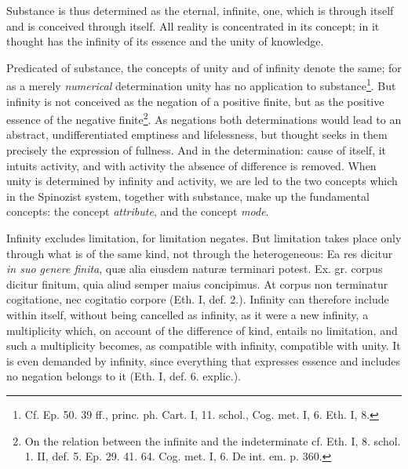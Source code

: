 \documentclass[12pt,a4paper,openany]{book}
\newcommand{\opage}[1]{\marginnote{\footnotesize\textit{[#1]}}}
\begin{document}
\opage{46}\setcounter{footnote}{0}Substance is thus determined as the eternal, infinite, one, which is through itself and is
conceived through itself. All reality is concentrated in
its concept; in it thought has the infinity of its essence and the unity
of knowledge.

Predicated of substance, the concepts of unity and of infinity denote the
same; for as a merely \emph{numerical} determination unity has no application
to substance\footnote{Cf. Ep. 50. 39 ff., princ. ph. Cart. I, 11.
schol., Cog. met. I, 6. Eth. I, 8.}. But infinity is not conceived
as the negation of a positive finite, but as the positive essence of the
negative finite\footnote{On the relation between the infinite and the
indeterminate cf. Eth. I, 8. schol. 1. II, def. 5. Ep. 29. 41. 64. Cog.
met. I, 6. De int. em. p. 360.}. As negations both
determinations would lead to an abstract, undifferentiated emptiness and lifelessness,
but thought seeks in them precisely the expression of fullness. And in the determination:
cause of itself, it intuits activity, and with activity the absence of
difference is removed. When unity is determined by infinity and
activity, we are led to the two concepts which in the Spinozist
system, together with substance, make up the fundamental concepts: the concept
\emph{attribute}, and the concept \emph{mode}.

Infinity excludes limitation, for limitation negates. But
limitation takes place only through what is of the same kind, not through the
heterogeneous: Ea res dicitur \emph{in suo genere finita}, quæ alia
eiusdem naturæ terminari potest. Ex. gr. corpus dicitur finitum, quia
aliud semper maius concipimus. At corpus non terminatur cogitatione,
nec cogitatio corpore (Eth. I, def. 2.). Infinity can therefore include within
itself, without being cancelled as infinity, as it were a new
infinity, a multiplicity which, on account of the difference of kind,
entails no limitation, and such a multiplicity becomes, as
compatible with infinity, compatible with unity. It is even demanded
by infinity, since everything that
\opage{47}\setcounter{footnote}{0}expresses essence and includes no negation belongs to it (Eth. I, def. 6.
explic.).
\end{document}
